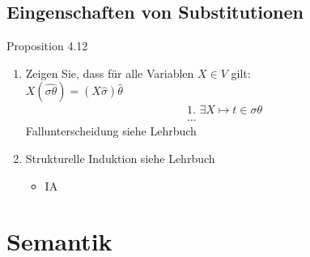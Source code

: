 \subsection{Eingenschaften von Substitutionen}
Proposition 4.12
\begin{enumerate}
	\item Zeigen Sie, dass für alle Variablen \(X \in V\) gilt: \\
	\( X(\widehat{\sigma\theta}) = (X\hat \sigma )\hat \theta \)
	\begin{align*}
		&\text{1. } \exists X\mapsto t\in \sigma\theta \\
		&\ldots
	\end{align*}
	Fallunterscheidung siehe Lehrbuch
	\item Strukturelle Induktion siehe Lehrbuch
	\begin{itemize}
		\item IA
	\end{itemize}
\end{enumerate}

\section{Semantik}
